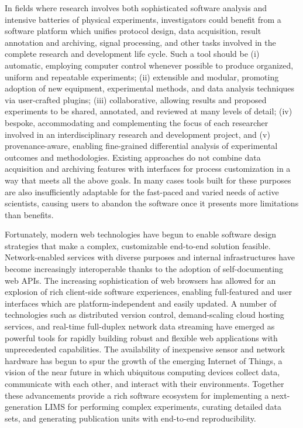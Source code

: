\documentclass[../thesis]{subfiles}
\begin{document}
In fields where research involves both sophisticated software analysis
and intensive batteries of physical experiments, investigators could
benefit from a software platform which unifies protocol design, data
acquisition, result annotation and archiving, signal processing, and
other tasks involved in the complete research and development life
cycle. Such a tool should be (i) automatic, employing computer control
whenever possible to produce organized, uniform and repeatable
experiments; (ii) extensible and modular, promoting adoption of new
equipment, experimental methods, and data analysis techniques via
user-crafted plugins; (iii) collaborative, allowing results and
proposed experiments to be shared, annotated, and reviewed at many
levels of detail; (iv) bespoke, accommodating and complementing the
focus of each researcher involved in an interdisciplinary research and
development project, and (v) provenance-aware, enabling fine-grained
differential analysis of experimental outcomes and
methodologies. Existing approaches do not combine data acquisition and
archiving features with interfaces for process customization in a way
that meets all the above goals. In many cases tools built for
these purposes are also insufficiently adaptable for the fast-paced
and varied needs of active scientists, causing users to abandon the
software once it presents more limitations than benefits.

Fortunately, modern web technologies have begun
to enable software design strategies that make a complex, customizable
end-to-end solution feasible. Network-enabled services with
diverse purposes and internal infrastructures have become increasingly
interoperable thanks to the adoption of self-documenting web APIs. The
increasing sophistication of web browsers has allowed for an
explosion of rich client-side software experiences, enabling
full-featured and user interfaces which are platform-independent and easily
updated. A number of technologies such as distributed version control,
demand-scaling cloud hosting services, and real-time full-duplex
network data streaming have emerged as powerful tools for
rapidly building robust and flexible web applications with
unprecedented capabilities. The
availability of inexpensive sensor and network hardware has begun to
spur the growth of the emerging Internet of Things, a vision of the
near future in which ubiquitous computing devices collect data,
communicate with each other, and interact with their environments.
Together these advancements provide a rich software ecosystem for
implementing a next-generation \gls{LIMS} for performing complex
experiments, curating detailed data sets, and generating publication
units with end-to-end reproducibility.
\end{document}

